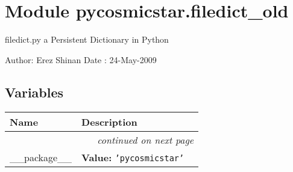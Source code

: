%
%
%


\section{Module pycosmicstar.filedict\_old}

    \label{pycosmicstar:filedict_old}
filedict.py a Persistent Dictionary in Python

Author: Erez Shinan Date  : 24-May-2009



  \subsection{Variables}

    \vspace{-1cm}
\hspace{\varindent}\begin{longtable}{|p{\varnamewidth}|p{\vardescrwidth}|l}
\cline{1-2}
\cline{1-2} \centering \textbf{Name} & \centering \textbf{Description}& \\
\cline{1-2}
\endhead\cline{1-2}\multicolumn{3}{r}{\small\textit{continued on next page}}\\\endfoot\cline{1-2}
\endlastfoot\raggedright \_\-\_\-p\-a\-c\-k\-a\-g\-e\-\_\-\_\- & \raggedright \textbf{Value:} 
{\tt \texttt{'}\texttt{pycosmicstar}\texttt{'}}&\\
\cline{1-2}
\end{longtable}



